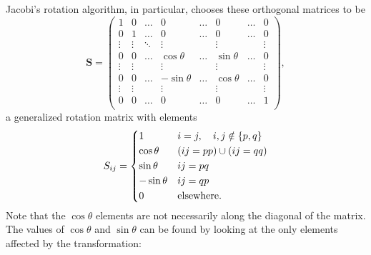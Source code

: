 \documentclass[aps,prc,reprint,nobalancelastpage]{revtex4-1}
\begin{document}
        Jacobi's rotation algorithm, in particular, chooses these orthogonal matrices to be
        \begin{equation}
            \mathbf{S} = \begin{pmatrix}
                1      & 0      & \dots  & 0           & \dots &  0         & \dots & 0\\
                0      & 1      & \dots  & 0           & \dots &  0         & \dots & 0\\
                \vdots & \vdots & \ddots & \vdots      &       & \vdots     &       & \vdots \\
                0      & 0      & \dots  & \cos\theta  & \dots & \sin\theta & \dots & 0\\
                \vdots & \vdots &        & \vdots      &       & \vdots     &       & \vdots \\
                0      & 0      & \dots  & -\sin\theta & \dots & \cos\theta & \dots & 0 \\
                \vdots & \vdots &        & \vdots      &       & \vdots     &       & \vdots \\
                0      & 0      & \dots  & 0           & \dots & 0          & \dots & 1 \\

            \end{pmatrix},
        \end{equation}
        a generalized rotation matrix with elements
        \begin{equation*}
            S_{ij} = \begin{dcases}
                1           & i=j,\quad i,j \notin \{p,q\}  \\
                \cos\theta  & (ij=pp) \cup (ij=qq) \\
                \sin\theta  & ij=pq \\
                -\sin\theta & ij=qp \\
                0           & \text{elsewhere}.
            \end{dcases}
        \end{equation*}
        Note that the $\cos\theta$ elements are not necessarily along the diagonal of the matrix. The values of $\cos\theta$ and $\sin\theta$ can be found by looking at the only elements affected by the transformation:
\end{document}

